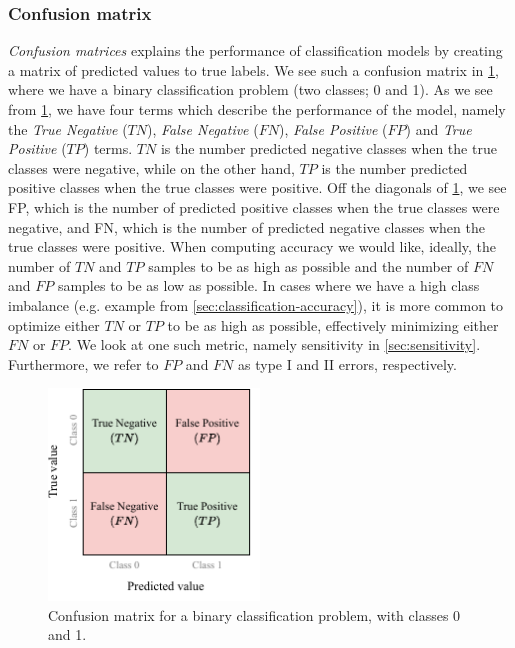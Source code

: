 \subsubsection{Confusion matrix}
\label{sec:confusion-matrix}
\textit{Confusion matrices} explains the performance of classification models by creating a matrix of predicted values to true labels. We see such a confusion matrix in \cref{fig:confusion-matrix}, where we have a binary classification problem (two classes; 0 and 1). As we see from \cref{fig:confusion-matrix}, we have four terms which describe the performance of the model, namely the \textit{True Negative} ($TN$), \textit{False Negative} ($FN$), \textit{False Positive} ($FP$) and \textit{True Positive} ($TP$) terms. $TN$ is the number predicted negative classes when the true classes were negative, while on the other hand, $TP$ is the number predicted positive classes when the true classes were positive. Off the diagonals of \cref{fig:confusion-matrix}, we see FP, which is the number of predicted positive classes when the true classes were negative, and FN, which is the number of predicted negative classes when the true classes were positive. When computing accuracy we would like, ideally, the number of $TN$ and $TP$ samples to be as high as possible and the number of $FN$ and $FP$ samples to be as low as possible. In cases where we have a high class imbalance (e.g. example from \cref{sec:classification-accuracy}), it is more common to optimize either $TN$ or $TP$ to be as high as possible, effectively minimizing either $FN$ or $FP$. We look at one such metric, namely sensitivity in \cref{sec:sensitivity}. Furthermore, we refer to $FP$ and $FN$ as type I and II errors, respectively.
\begin{figure}
    \centering
    \includegraphics[width=0.5\textwidth]{thesis/figures/confusion-matrix_cropped.pdf}
    \caption{Confusion matrix for a binary classification problem, with classes 0 and 1.}
    \label{fig:confusion-matrix}
\end{figure}

